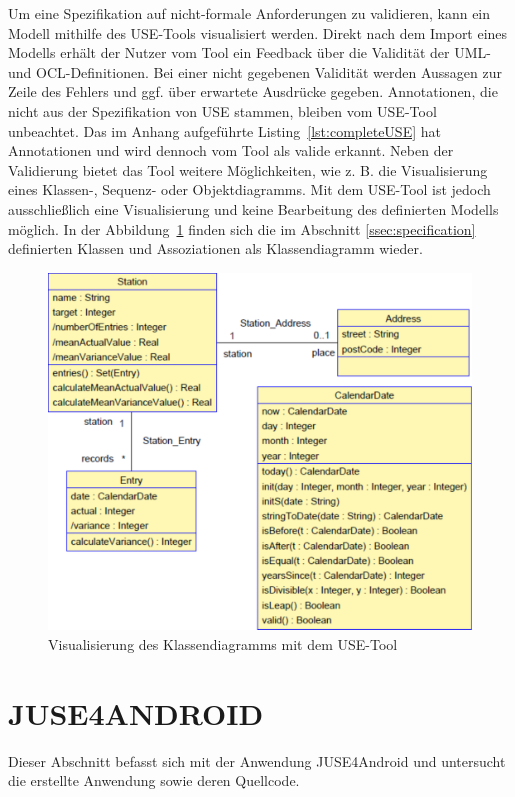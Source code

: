 \documentclass[a4paper,twoside]{article}
\begin{document}
Um eine Spezifikation auf nicht-formale Anforderungen zu validieren, kann ein Modell mithilfe des USE-Tools visualisiert werden. Direkt nach dem Import eines Modells erhält der Nutzer vom Tool ein Feedback über die Validität der UML- und OCL-Definitionen. Bei einer nicht gegebenen Validität werden Aussagen zur Zeile des Fehlers und ggf. über erwartete Ausdrücke gegeben. Annotationen, die nicht aus der Spezifikation von USE stammen, bleiben vom USE-Tool unbeachtet. Das im Anhang aufgeführte Listing~\ref{lst:completeUSE} hat Annotationen und wird dennoch vom Tool als valide erkannt. Neben der Validierung bietet das Tool weitere Möglichkeiten, wie z. B. die Visualisierung eines Klassen-, Sequenz- oder Objektdiagramms. Mit dem USE-Tool ist jedoch ausschließlich eine Visualisierung und keine Bearbeitung des definierten Modells möglich. In der Abbildung~\ref{fig:Grafik2} finden sich die im Abschnitt \ref{ssec:specification} definierten Klassen und Assoziationen als Klassendiagramm wieder.

\begin{figure}[!h]
	\includegraphics[scale=.325]{pics/USE_class_diagram_v2.pdf}
	\caption{Visualisierung des Klassendiagramms mit dem USE-Tool}
	\label{fig:Grafik2}
\end{figure}


\section{\uppercase{JUSE4Android}}
\label{JUSE4Android}
Dieser Abschnitt befasst sich mit der Anwendung JUSE4Android und untersucht die erstellte Anwendung sowie deren Quellcode. 
\end{document}
